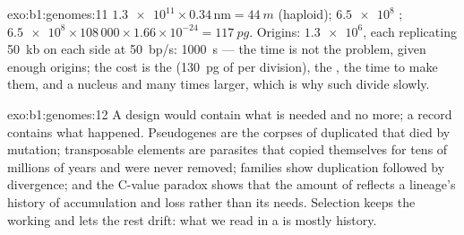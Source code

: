 \begin{solution}{exo:b1:genomes:11}
$\num{1.3e11}\times 0.34\,\mathrm{nm} = \qty{44}{m}$ (haploid);
$\num{6.5e8}$ ;  $\num{6.5e8}\times 108\,000\times
1.66\times 10^{-24} = \qty{117}{pg}$. Origins: $\num{1.3e6}$, each
replicating \qty{50}{kb} on each side at \qty{50}{bp/s}: \qty{1000}{s}
--- the time is not the problem, given enough origins; the cost is the
 (\qty{130}{pg} of  per division), the , the
time to make them, and a nucleus and  many times larger, which is
why such  divide slowly.
\end{solution}

\begin{solution}{exo:b1:genomes:12}
A design would contain what is needed and no more; a record contains
what happened. Pseudogenes are the corpses of duplicated  that
died by mutation; transposable elements are parasites that copied
themselves for tens of millions of years and were never removed; 
families show duplication followed by divergence; and the C-value
paradox shows that the amount of  reflects a lineage's history of
accumulation and loss rather than its needs. Selection keeps the 
working and lets the rest drift: what we read in a  is
mostly history.
\end{solution}

